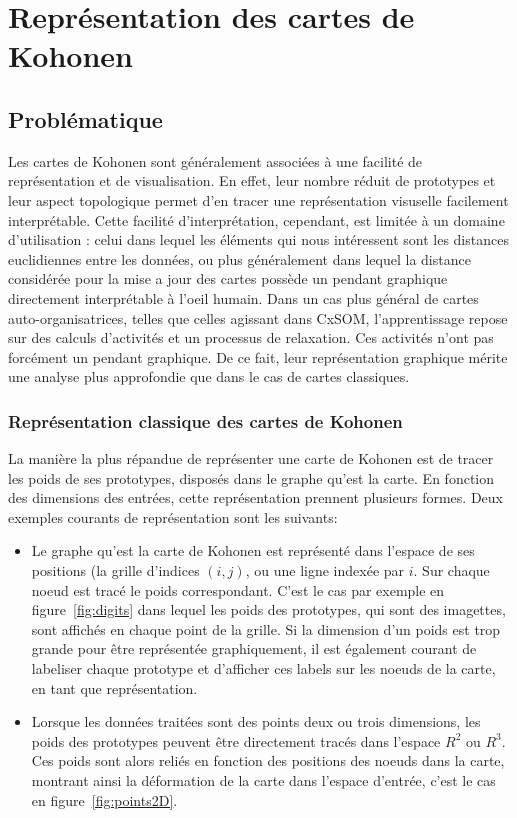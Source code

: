 \chapter{Représentation des cartes de Kohonen}
\graphicspath{{03-Representation/}}

\minitoc
\section{Problématique}

Les cartes de Kohonen sont généralement associées à une facilité de représentation et de visualisation. En effet, leur nombre réduit de prototypes et leur aspect topologique permet d'en tracer une représentation visuselle facilement interprétable. Cette facilité d'interprétation, cependant, est limitée à un domaine d'utilisation : celui dans lequel les éléments qui nous intéressent sont les distances euclidiennes entre les données, ou plus généralement dans lequel la distance considérée pour la mise a jour des cartes possède un pendant graphique directement interprétable à l'oeil humain. Dans un cas plus général de cartes auto-organisatrices, telles que celles agissant dans CxSOM, l'apprentissage repose sur des calculs d'activités et un processus de relaxation. Ces activités n'ont pas forcément un pendant graphique. De ce fait, leur représentation graphique mérite une analyse plus approfondie que dans le cas de cartes classiques. 

\subsection{Représentation classique des cartes de Kohonen}

La manière la plus répandue de représenter une carte de Kohonen est de tracer les poids de ses prototypes, disposés dans le graphe qu'est la carte. En fonction des dimensions des entrées, cette représentation prennent plusieurs formes. Deux exemples courants de représentation sont les suivants: 
\begin{itemize}
\item Le graphe qu'est la carte de Kohonen est représenté dans l'espace de ses positions (la grille d'indices $(i,j)$, ou une ligne indexée par $i$. Sur chaque noeud est tracé le poids correspondant. C'est le cas par exemple en figure~\ref{fig:digits} dans lequel les poids des prototypes, qui sont des imagettes, sont affichés en chaque point de la grille. Si la dimension d'un poids est trop grande pour être représentée graphiquement, il est également courant de labeliser chaque prototype et d'afficher ces labels sur les noeuds de la carte, en tant que représentation.
\item Lorsque les données traitées sont des points deux ou trois dimensions, les poids des prototypes peuvent être directement tracés dans l'espace $R^2$ ou $R^3$. Ces poids sont alors reliés en fonction des positions des noeuds dans la carte, montrant ainsi la déformation de la carte dans l'espace d'entrée, c'est le cas en figure~\ref{fig:points2D}.
\end{itemize}

